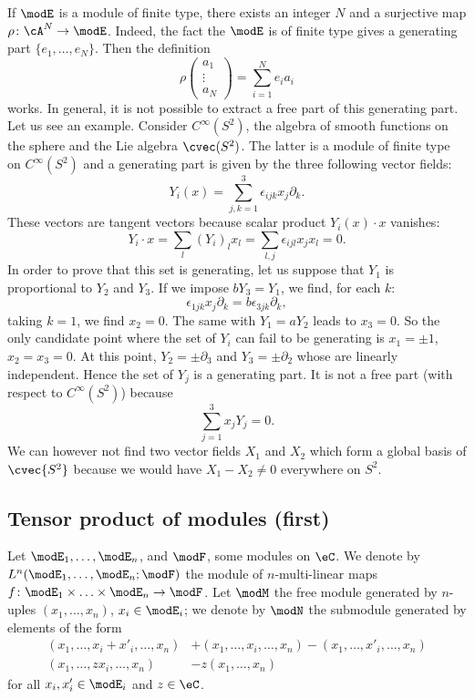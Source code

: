 If $\modE$ is a module of finite type, there exists an integer $N$ and a surjective map $\rho\colon \cA^N\to \modE$. Indeed, the fact the $\modE$ is of finite type gives a generating part $\{ e_1,\ldots,e_N \}$. Then the definition
\[
	\rho
	\begin{pmatrix}
		a_1 \\\vdots\\ a_N
	\end{pmatrix}
	=
	\sum_{i=1}^N e_ia_i
\]
works. In general, it is not possible to extract a free part of this generating part. Let us see an example. Consider $ C^{\infty}(S^2)$, the algebra of smooth functions on the sphere and the Lie algebra $\cvec(S^2)$. The latter is a module of finite type on $ C^{\infty}(S^2)$ and a generating part is given by the three following vector fields:
\[
	Y_i(x)=\sum_{j,k=1}^3 \epsilon_{ijk}x_j\partial_k.
\]
These vectors are tangent vectors because scalar product $Y_i(x)\cdot x$ vanishes:
\[
	Y_i\cdot x =\sum_l (Y_i)_lx_l=\sum_{l,j}\epsilon_{ijl} x_jx_l=0.
\]
In order to prove that this set is generating, let us suppose that $Y_1$ is proportional to $Y_2$ and $Y_3$. If we impose $bY_3=Y_1$, we find, for each $k$:
\[
	\epsilon_{1jk} x_j\partial_k=b\epsilon_{3jk}\partial_k,
\]
taking $k=1$, we find $x_2=0$. The same with $Y_1=aY_2$ leads to $x_3=0$. So the only candidate point where the set of $Y_i$ can fail to be generating is $x_1=\pm 1$, $x_2=x_3=0$. At this point, $Y_2=\pm\partial_3$ and $Y_3=\pm\partial_2$ whose are linearly independent. Hence the set of $Y_j$ is a generating part. It is not a free part (with respect to $ C^{\infty}(S^2)$) because
\[
	\sum_{j=1}^3 x_jY_j=0.
\]
We can however not find two vector fields $X_1$ and $X_2$ which form a global basis of $\cvec{S^2}$ because we would have $X_1-X_2\neq0$ everywhere on $S^2$.

\subsection{Tensor product of modules (first)}

Let $\modE_1,\ldots,\modE_n$, and $\modF$, some modules on $\eC$. We denote by $L^n(\modE_1,\ldots,\modE_n;\modF)$ the module of $n$-multi-linear maps $f\colon \modE_1\times\ldots\times\modE_n\to \modF$. Let $\modM$ the free module generated by $n$-uples $(x_1,\ldots,x_n)$, $x_i\in\modE_i$; we denote by $\modN$ the submodule generated by elements of the form
\begin{subequations}
	\begin{align}
		(x_1,\ldots,x_i+x'_i,\ldots,x_n) & +(x_1,\ldots,x_i,\ldots,x_n)-(x_1,\ldots,x'_i,\ldots,x_n) \\
		(x_1,\ldots,zx_i,\ldots,x_n)     & -z(x_1,\ldots,x_n)
	\end{align}
\end{subequations}
for all $x_i,x'_i\in\modE_i$ and $z\in\eC$.


